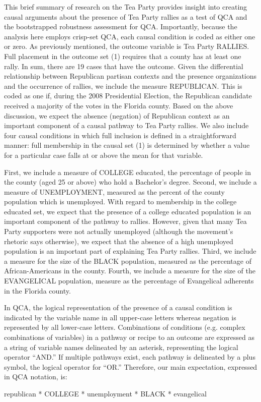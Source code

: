 \documentclass[12pt]{article}
\begin{document}
{{{{This brief summary of research on the Tea Party provides insight into creating causal arguments about the presence of Tea Party rallies as a test of QCA and the bootstrapped robustness assessment for QCA. Importantly, because the analysis here employs crisp-set QCA, each causal condition is coded as either one or zero. As previously mentioned, the outcome variable is Tea Party RALLIES. Full placement in the outcome set (1) requires that a county has at least one rally. In sum, there are 19 cases that have the outcome. Given the differential relationship between Republican partisan contexts and the presence organizations and the occurrence of rallies, we include the measure REPUBLICAN. This is coded as one if, during the 2008 Presidential Election, the Republican candidate received a majority of the votes in the Florida county. Based on the above discussion, we expect the absence (negation) of Republican context as an important component of a causal pathway to Tea Party rallies. We also include four causal conditions in which full inclusion is defined in a straightforward manner: full membership in the causal set (1) is determined by whether a value for a particular case falls at or above the mean for that variable. 

First, we include a measure of COLLEGE educated, the percentage of people in the county (aged 25 or above) who hold a Bachelor's degree. Second, we include a measure of UNEMPLOYMENT, measured as the percent of the county population which is unemployed. With regard to membership in the college educated set, we expect that the presence of a college educated population is an important component of the pathway to rallies. However, given that many Tea Party supporters were not actually unemployed (although the movement's rhetoric says otherwise), we expect that the absence of a high unemployed population is an important part of explaining Tea Party rallies. Third, we include a measure for the size of the BLACK population, measured as the percentage of African-Americans in the county. Fourth, we include a measure for the size of the EVANGELICAL population, measure as the percentage of Evangelical adherents in the Florida county. 

In QCA, the logical representation of the presence of a causal condition is indicated by the variable name in all upper-case letters whereas negation is represented by all lower-case letters. Combinations of conditions (e.g. complex combinations of variables) in a pathway or recipe to an outcome are expressed as a string of variable names delineated by an asterisk, representing the logical operator ``AND.'' If multiple pathways exist, each pathway is delineated by a plus symbol, the logical operator for ``OR.'' Therefore, our main expectation, expressed in QCA notation, is:
\begin{center}
republican * COLLEGE * unemployment * BLACK * evangelical
\end{center}

}}}}
\end{document}
